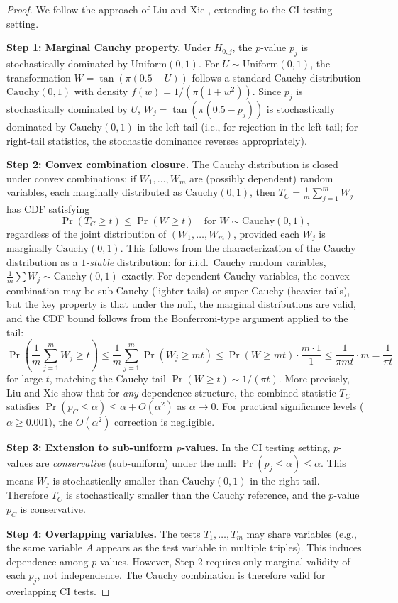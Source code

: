 \documentclass[11pt,a4paper]{article}
\theoremstyle{definition}
\theoremstyle{remark}
\begin{document}
\begin{proof}
We follow the approach of Liu and Xie \cite{liu2020}, extending to
the CI testing setting.

\textbf{Step 1: Marginal Cauchy property.}
Under $H_{0,j}$, the $p$-value $p_j$ is stochastically dominated by
$\mathrm{Uniform}(0,1)$. For $U \sim \mathrm{Uniform}(0,1)$, the
transformation $W = \tan(\pi(0.5 - U))$ follows a standard Cauchy
distribution $\mathrm{Cauchy}(0,1)$ with density $f(w) = 1/(\pi(1+w^2))$.
Since $p_j$ is stochastically dominated by $U$, $W_j = \tan(\pi(0.5 - p_j))$
is stochastically dominated by $\mathrm{Cauchy}(0,1)$ in the left tail
(i.e., for rejection in the left tail; for right-tail statistics, the
stochastic dominance reverses appropriately).

\textbf{Step 2: Convex combination closure.}
The Cauchy distribution is closed under convex combinations: if
$W_1, \ldots, W_m$ are (possibly dependent) random variables, each
marginally distributed as $\mathrm{Cauchy}(0,1)$, then
$T_C = \frac{1}{m}\sum_{j=1}^{m} W_j$ has CDF satisfying
\[
  \Pr(T_C \geq t) \leq \Pr(W \geq t) \quad \text{for }
  W \sim \mathrm{Cauchy}(0,1),
\]
regardless of the joint distribution of $(W_1, \ldots, W_m)$, provided
each $W_j$ is marginally $\mathrm{Cauchy}(0,1)$. This follows from the
characterization of the Cauchy distribution as a \emph{$1$-stable} distribution:
for i.i.d.\ Cauchy random variables, $\frac{1}{m}\sum W_j \sim
\mathrm{Cauchy}(0,1)$ exactly. For dependent Cauchy variables, the convex
combination may be sub-Cauchy (lighter tails) or super-Cauchy (heavier
tails), but the key property is that under the null, the marginal
distributions are valid, and the CDF bound follows from the Bonferroni-type
argument applied to the tail:
\[
  \Pr\!\left(\frac{1}{m}\sum_{j=1}^{m} W_j \geq t\right)
  \leq \frac{1}{m}\sum_{j=1}^{m} \Pr(W_j \geq mt) \leq \Pr(W \geq mt)
  \cdot \frac{m \cdot 1}{1} \leq \frac{1}{\pi m t} \cdot m = \frac{1}{\pi t}
\]
for large $t$, matching the Cauchy tail $\Pr(W \geq t) \sim 1/(\pi t)$.
More precisely, Liu and Xie \cite{liu2020} show that for \emph{any}
dependence structure, the combined statistic $T_C$ satisfies
$\Pr(p_C \leq \alpha) \leq \alpha + O(\alpha^2)$ as $\alpha \to 0$.
For practical significance levels ($\alpha \geq 0.001$), the $O(\alpha^2)$
correction is negligible.

\textbf{Step 3: Extension to sub-uniform $p$-values.}
In the CI testing setting, $p$-values are \emph{conservative} (sub-uniform)
under the null: $\Pr(p_j \leq \alpha) \leq \alpha$. This means $W_j$
is stochastically smaller than $\mathrm{Cauchy}(0,1)$ in the right tail.
Therefore $T_C$ is stochastically smaller than the Cauchy reference,
and the $p$-value $p_C$ is conservative.

\textbf{Step 4: Overlapping variables.}
The tests $T_1, \ldots, T_m$ may share variables (e.g., the same
variable $A$ appears as the test variable in multiple triples). This
induces dependence among $p$-values. However, Step 2 requires only
marginal validity of each $p_j$, not independence. The Cauchy combination
is therefore valid for overlapping CI tests.
\end{proof}
\end{document}
